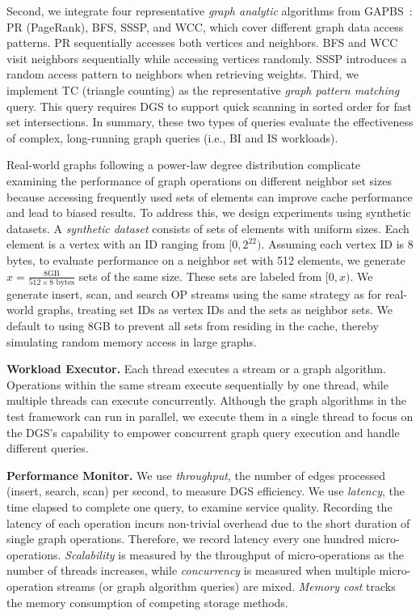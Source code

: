 Second, we integrate four representative \emph{graph analytic} algorithms from GAPBS~\cite{beamer2015gap}: PR (PageRank), BFS, SSSP, and WCC, which cover different graph data access patterns. PR sequentially accesses both vertices and neighbors. BFS and WCC visit neighbors sequentially while accessing vertices randomly. SSSP introduces a random access pattern to neighbors when retrieving weights. Third, we implement TC (triangle counting) as the representative \emph{graph pattern matching} query. This query requires DGS to support quick scanning in sorted order for fast set intersections. In summary, these two types of queries evaluate the effectiveness of complex, long-running graph queries (i.e., BI and IS workloads).

Real-world graphs following a power-law degree distribution complicate examining the performance of graph operations on different neighbor set sizes because accessing frequently used sets of elements can improve cache performance and lead to biased results. To address this, we design experiments using synthetic datasets. A \emph{synthetic dataset} consists of sets of elements with uniform sizes. Each element is a vertex with an ID ranging from $[0, 2^{22})$. Assuming each vertex ID is 8 bytes, to evaluate performance on a neighbor set with 512 elements, we generate $x = \frac{8 \text{GB}}{512 \times 8 \text{ bytes}}$ sets of the same size. These sets are labeled from $[0, x)$. We generate insert, scan, and search OP streams using the same strategy as for real-world graphs, treating set IDs as vertex IDs and the sets as neighbor sets. We default to using 8GB to prevent all sets from residing in the cache, thereby simulating random memory access in large graphs.



\vspace{2pt}
\noindent\textbf{Workload Executor.} Each thread executes a stream or a graph algorithm. Operations within the same stream execute sequentially by one thread, while multiple threads can execute concurrently. Although the graph algorithms in the test framework can run in parallel, we execute them in a single thread to focus on the DGS's capability to empower concurrent graph query execution and handle different queries.

\vspace{2pt}
\noindent\textbf{Performance Monitor.} We use \emph{throughput}, the number of edges processed (insert, search, scan) per second, to measure DGS efficiency. We use \emph{latency}, the time elapsed to complete one query, to examine service quality. Recording the latency of each operation incurs non-trivial overhead due to the short duration of single graph operations. Therefore, we record latency every one hundred micro-operations. \emph{Scalability} is measured by the throughput of micro-operations as the number of threads increases, while \emph{concurrency} is measured when multiple micro-operation streams (or graph algorithm queries) are mixed. \emph{Memory cost} tracks the memory consumption of competing storage methods.
